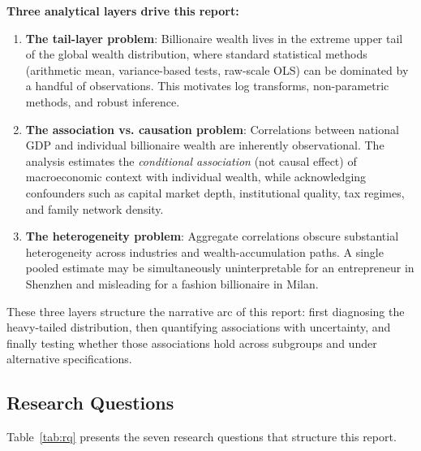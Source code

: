 \documentclass[a4paper,10pt]{article}
\begin{document}
\textbf{Three analytical layers drive this report:}
\begin{enumerate}
    \item \textbf{The tail-layer problem}: Billionaire wealth lives in the extreme upper tail of the global wealth distribution, where standard statistical methods (arithmetic mean, variance-based tests, raw-scale OLS) can be dominated by a handful of observations. This motivates log transforms, non-parametric methods, and robust inference.
    \item \textbf{The association vs. causation problem}: Correlations between national GDP and individual billionaire wealth are inherently observational. The analysis estimates the \emph{conditional association} (not causal effect) of macroeconomic context with individual wealth, while acknowledging confounders such as capital market depth, institutional quality, tax regimes, and family network density.
    \item \textbf{The heterogeneity problem}: Aggregate correlations obscure substantial heterogeneity across industries and wealth-accumulation paths. A single pooled estimate may be simultaneously uninterpretable for an entrepreneur in Shenzhen and misleading for a fashion billionaire in Milan.
\end{enumerate}

These three layers structure the narrative arc of this report: first diagnosing the heavy-tailed distribution, then quantifying associations with uncertainty, and finally testing whether those associations hold across subgroups and under alternative specifications.

\subsection{Research Questions}
Table~\ref{tab:rq} presents the seven research questions that structure this report.

\begin{table}[H]
\centering
\caption{Research questions and their mapping to analytical modules.}
\label{tab:rq}
\scriptsize
\resizebox{\textwidth}{!}{}
\end{table}
\end{document}
